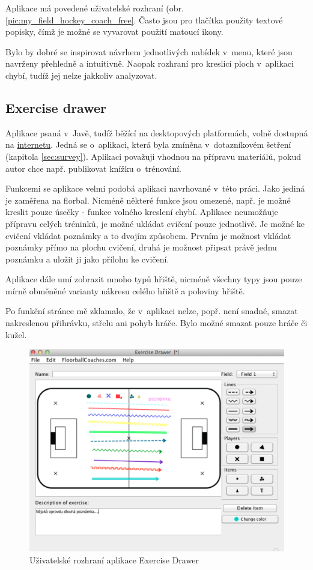 \documentclass[thesis=B,czech]{FITthesis}[2012/06/26]
\begin{document}
	Aplikace má povedené uživatelské rozhraní (obr. \ref{pic:my_field_hockey_coach_free}. Často jsou pro tlačítka použity textové popisky, čímž je možné se vyvarovat použití matoucí ikony.

	Bylo by dobré se inspirovat návrhem jednotlivých nabídek v~menu, které jsou navrženy přehledně a intuitivně. Naopak rozhraní pro kreslicí ploch v~aplikaci chybí, tudíž jej nelze jakkoliv analyzovat.

	\subsection{Exercise drawer \cite{exerciseDrawerOnline}}

	Aplikace psaná v~Javě, tudíž běžící na desktopových platformách, volně dostupná na \href{http://floorballcoach.org/exercisedrawer/}{internetu}. Jedná se o~aplikaci, která byla zmíněna v~dotazníkovém šetření (kapitola \ref{sec:survey}). Aplikaci považuji vhodnou na přípravu materiálů, pokud autor chce např. publikovat knížku o~trénování.

	Funkcemi se aplikace velmi podobá aplikaci navrhované v~této práci. Jako jediná je zaměřena na florbal. Nicméně některé funkce jsou omezené, např. je možné kreslit pouze úsečky \-- funkce volného kreslení chybí. Aplikace neumožňuje přípravu celých tréninků, je možné ukládat cvičení pouze jednotlivě. Je možné ke cvičení vkládat poznámky a to dvojím způsobem. Prvním je možnost vkládat poznámky přímo na plochu cvičení, druhá je možnost připsat právě jednu poznámku a uložit ji jako přílohu ke cvičení.

	Aplikace dále umí zobrazit mnoho typů hřiště, nicméně všechny typy jsou pouze mírně obměněné varianty nákresu celého hřiště a poloviny hřiště.

	Po funkční stránce mě zklamalo, že v~aplikaci nelze, popř. není snadné, smazat nakreslenou přihrávku, střelu ani pohyb hráče. Bylo možné smazat pouze hráče či kužel.

	\begin{figure}[h!t]
		\centering
		\includegraphics[width=\textwidth]{img/competition/exercise_drawer}
		\caption{Uživatelské rozhraní aplikace Exercise Drawer}
		\label{pic:exercise_drawer}
	\end{figure}
\end{document}
